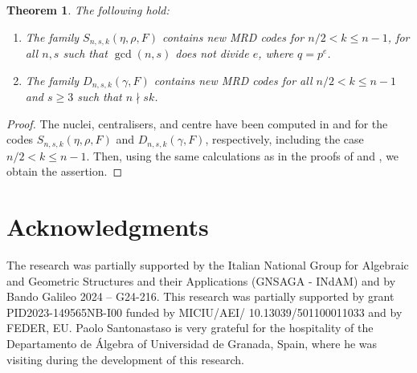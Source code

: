\documentclass[a4paper, 11pt]{article}
\newtheorem{theorem}{Theorem}[section]
\begin{document}
\begin{theorem}The following hold: 
\begin{enumerate}
    \item The family $S_{n,s,k}(\eta,\rho,F)$ contains new MRD codes for $n/2 < k \leq n-1$, for all $n,s$ such that $\gcd(n,s)$ does not divide $e$, where $q = p^e$.
 \item The family $D_{n,s,k}(\gamma,F)$ contains new MRD codes for all $n/2 < k \leq n-1$ and $s \geq 3$ such that $n \nmid sk$. 
 \end{enumerate}

    
\end{theorem}

\begin{proof}
The nuclei, centralisers, and centre have been computed in  and  for the codes $S_{n,s,k}(\eta, \rho, F)$ and $D_{n,s,k}(\gamma, F)$, respectively, including the case $n/2 < k \leq n - 1$. Then, using the same calculations as in the proofs of \cite[Theorem 9]{sheekey2020new} and \cite[Theorem 5.12]{lobillo2025quotients}, we obtain the assertion.
\end{proof}


\section*{Acknowledgments}
The research was partially supported by the Italian National Group for Algebraic and Geometric Structures and their Applications (GNSAGA - INdAM) and by Bando Galileo 2024 – G24-216. This research was partially supported by grant PID2023-149565NB-I00 funded by MICIU/AEI/ 10.13039/501100011033 and by FEDER, EU. Paolo Santonastaso is very grateful for the hospitality of the Departamento de \'Algebra of
Universidad de Granada, Spain, where he was visiting during the development of this research.



%
%
%
\end{document}

